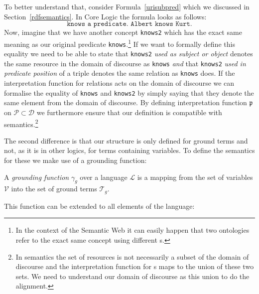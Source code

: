 To better understand that, consider 
Formula~\ref{urisubpred} which we discussed in Section~\ref{rdfsemantics}. In \nthree Core Logic the formula looks as follows:
% 
% 
\[
 \texttt{knows a predicate. Albert knows Kurt.}
\]
Now, imagine that we have another concept \texttt{knows2} which has the exact same meaning as our original predicate \texttt{knows}.\footnote{In the context of the Semantic Web
it can easily happen that two ontologies refer to the exact same concept using different \uri{}s.} If we want to formally define this equality we need to be able to state that
\texttt{knows2} 
\emph{used as subject or object} denotes the same resource in the domain of discourse as  \texttt{knows} \emph{and} that \texttt{knows2} \emph{used in predicate position} 
of a triple denotes the same 
relation as \texttt{knows} does. If the interpretation function for relations acts on the domain of discourse we can formalise the equality of \texttt{knows}  and \texttt{knows2} by 
simply saying that they denote the same element from the domain of discourse. By defining interpretation function $\mathfrak{p}$ on $\mathcal{P}\subset\mathcal{D}$ we furthermore ensure 
that our definition is compatible with \rdf semantics.\footnote{In \rdf semantics the set
of resources is not necessarily a subset of the domain of discourse and the interpretation function for \iri{}s maps to the union of these two sets. 
We need to understand our domain of discourse as this union to do the alignment. 
} 

The second difference is that our structure is only defined for ground terms and not, as it is in other logics, for terms containing variables. 
To define the semantics for these we make use of a grounding function:


\begin{definition}
A \emph{grounding function} $\gamma_g$ over a language $\mathcal{L}$ is a mapping from the set of variables $\mathcal{V}$ %
into the set of ground terms $\mathcal{T}_g$. 
\end{definition}

This function can be extended to all elements of the language:

